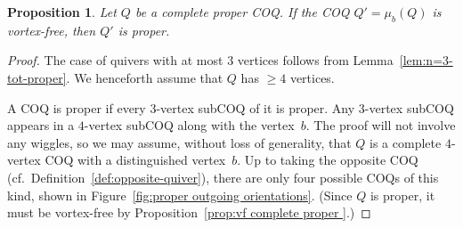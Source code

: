 \documentclass[11pt, letterpaper]{amsart}
\newtheorem{proposition}[theorem]{Proposition}
\theoremstyle{definition}
\numberwithin{equation}{section}
\begin{document}
\begin{proposition}
\label{pr:propagation-under-VF}
Let $Q$ be a complete proper COQ. 
If the COQ $Q'=\mu_b(Q)$ is vortex-free, then $Q'$ is proper. 
\end{proposition}

\begin{proof}
The case of quivers with at most $3$ vertices follows from Lemma~\ref{lem:n=3-tot-proper}.
We henceforth assume that $Q$ has $\ge4$ vertices. 

A COQ is proper if every $3$-vertex subCOQ of it is proper. 
Any $3$-vertex subCOQ appears in a $4$-vertex subCOQ along with the vertex~$b$. 
The proof will not involve any wiggles, so we may assume, without loss of generality, 
that $Q$ is a complete $4$-vertex COQ with a distinguished vertex~$b$. 
Up to taking the opposite COQ (cf.\ Definition~\ref{def:opposite-quiver}), 
there are only four possible COQs of this kind, shown in Figure~\ref{fig:proper outgoing orientations}. 
(Since $Q$ is proper, it must be vortex-free by Proposition~\ref{prop:vf complete proper }.)

\pagebreak[3]


\vspace{5pt}


\end{proof}
\end{document}
